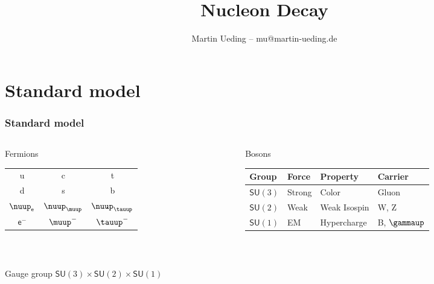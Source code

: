 \documentclass[english, fleqn]{beamer}
\title{Nucleon Decay}
\author{Martin Ueding -- mu@martin-ueding.de}
\begin{document}
\begin{frame}
    \titlepage
\end{frame}

\section{Standard model}

\begin{frame}
    \frametitle{Standard model}

    \begin{columns}[t]
        \begin{column}{.3\linewidth}
            \begin{block}{Fermions}
                \

                \begin{tabular}{ccc}
                    u & c & t \\
                    d & s & b \\
                    \midrule
                    $\nuup_\mathsf e$ & $\nuup_\muup$ & $\nuup_\tauup$ \\
                    $\mathsf e^-$ & $ \muup^-$ & $\tauup^-$
                \end{tabular}
            \end{block}
        \end{column}
        \begin{column}{.7\linewidth}
            \begin{block}{Bosons}
                \

                \begin{tabular}{llll}
                    Group & Force & Property & Carrier \\
                    \midrule
                    $\mathsf{SU}(3)$ & Strong & Color & Gluon \\
                    $\mathsf{SU}(2)$ & Weak & Weak Isospin & W, Z \\
                    $\mathsf{SU}(1)$ & EM & Hypercharge & B, $\gammaup$
                \end{tabular}
            \end{block}
        \end{column}
    \end{columns}

    \

    \begin{block}{Gauge group}
        $\mathsf{SU}(3) \times \mathsf{SU}(2) \times \mathsf{SU}(1)$
    \end{block}

\end{frame}
\end{document}
